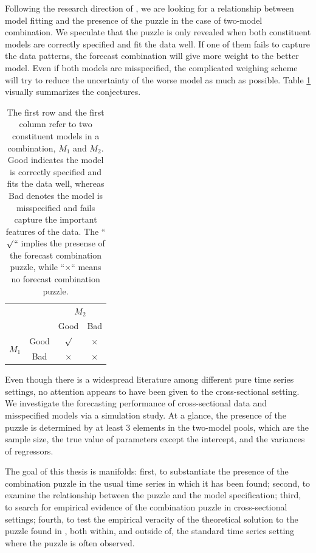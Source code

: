\documentclass{monashthesis}
\begin{document}
Following the research direction of \textcite{BS16}, we are looking for a relationship between model fitting and the presence of the puzzle in the case of two-model combination. We speculate that the puzzle is only revealed when both constituent models are correctly specified and fit the data well. If one of them fails to capture the data patterns, the forecast combination will give more weight to the better model. Even if both models are misspecified, the complicated weighing scheme will try to reduce the uncertainty of the worse model as much as possible. Table \ref{tab:1} visually summarizes the conjectures.

\begin{table}[ht]
\centering
\begin{tabular}{cccc}
                       &      & \multicolumn{2}{c}{$M_2$} \\
                       &      & Good       & Bad       \\
\multirow{2}{*}{$M_1$} & Good & $\surd$    & $\times$ \\
                       & Bad  & $\times$   & $\times$
\end{tabular}
\caption{The first row and the first column refer to two constituent models in a combination, $M_1$ and $M_2$. Good indicates the model is correctly specified and fits the data well, whereas Bad denotes the model is misspecified and fails capture the important features of the data. The ``$\surd$`` implies the presense of the forecast combination puzzle, while ``$\times$`` means no forecast combination puzzle.}
\label{tab:1}
\end{table}

Even though there is a widespread literature among different pure time series settings, no attention appears to have been given to the cross-sectional setting. We investigate the forecasting performance of cross-sectional data and misspecified models via a simulation study. At a glance, the presence of the puzzle is determined by at least 3 elements in the two-model pools, which are the sample size, the true value of parameters except the intercept, and the variances of regressors.

The goal of this thesis is manifolds: first, to substantiate the presence of the combination puzzle in the usual time series in which it has been found; second, to examine the relationship between the puzzle and the model specification; third, to search for empirical evidence of the combination puzzle in cross-sectional settings; fourth, to test the empirical veracity of the theoretical solution to the puzzle found in \textcite{FZMP23}, both within, and outside of, the standard time series setting where the puzzle is often observed.
\end{document}
